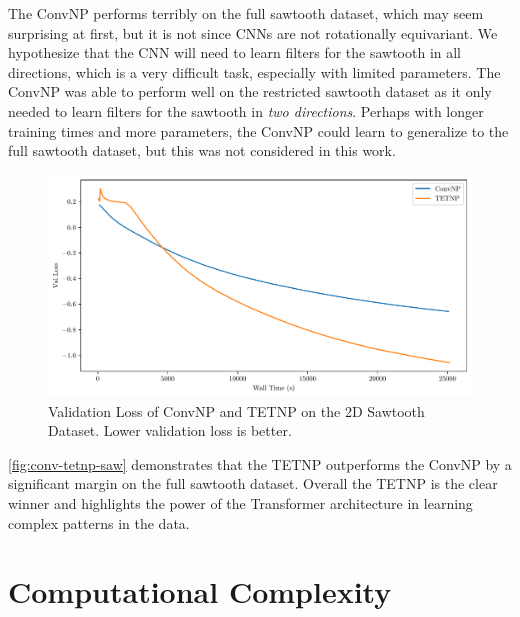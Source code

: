 \documentclass[../../main.tex]{subfiles}
\begin{document}
The ConvNP performs terribly on the full sawtooth dataset, which may seem surprising at first, but it is not since CNNs are not rotationally equivariant. We hypothesize that the CNN will need to learn filters for the sawtooth in all directions, which is a very difficult task, especially with limited parameters. The ConvNP was able to perform well on the restricted sawtooth dataset as it only needed to learn filters for the sawtooth in \emph{two directions}. Perhaps with longer training times and more parameters, the ConvNP could learn to generalize to the full sawtooth dataset, but this was not considered in this work.



\begin{figure}[H]
    \centering
    \includegraphics[width=0.6\linewidth]{./fig/conv-tetnp-saw.pdf}
    \caption{Validation Loss of ConvNP and TETNP on the 2D Sawtooth Dataset. Lower validation loss is better.}
    \label{fig:conv-tetnp-saw}
\end{figure}

\autoref{fig:conv-tetnp-saw} demonstrates that the TETNP outperforms the ConvNP by a significant margin on the full sawtooth dataset. Overall the TETNP is the clear winner and highlights the power of the Transformer architecture in learning complex patterns in the data.



\section{Computational Complexity}
\end{document}
